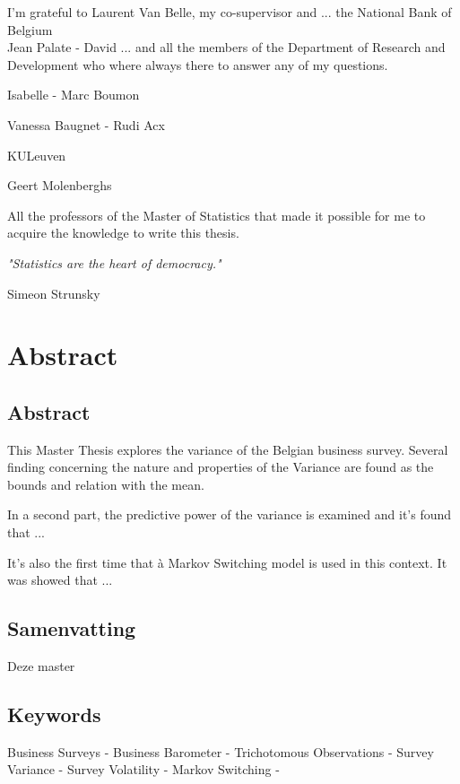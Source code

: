 \documentclass[12pt,a4paper,oneside]{book}
\newenvironment{bottompar}{\par\vspace*{\fill}}{\clearpage}
\begin{document}
I'm grateful to Laurent Van Belle, my co-supervisor and ...
the National Bank of Belgium \\
Jean Palate - David ... 
and all the members of the Department of Research and Development who where always there to answer any of my questions.

Isabelle - Marc Boumon

Vanessa Baugnet - Rudi Acx 


KULeuven

Geert Molenberghs

All the professors of the Master of Statistics that made it possible for me to acquire the knowledge to write this thesis.



\begin{bottompar}
\textit{"Statistics are the heart of democracy." }

    Simeon Strunsky
\end{bottompar}


\chapter*{Abstract}


\section*{Abstract}
This Master Thesis explores the variance of the Belgian business survey. 
Several finding concerning the nature and properties of the Variance are found as the bounds and relation with the mean.

In a second part, the predictive power of the variance is examined and it's found that ...

It's also the first time that à Markov Switching model is used in this context. It was showed that ...


\section*{Samenvatting}

Deze master


\section*{Keywords}
Business Surveys - 
Business Barometer -
Trichotomous Observations -
Survey Variance - 
Survey Volatility -
Markov Switching - 

\tableofcontents
\end{document}
